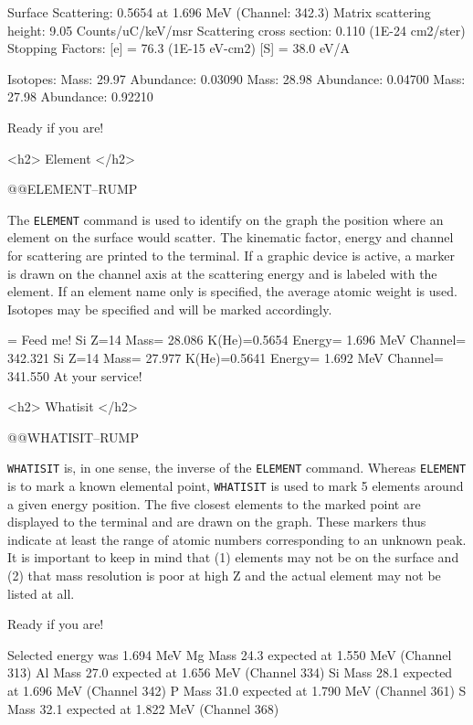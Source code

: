 {{{{{ Surface Scattering:         0.5654 at  1.696 MeV (Channel: 342.3)
 Matrix scattering height:     9.05 Counts/uC/keV/msr
 Scattering cross section:     0.110 (1E-24 cm2/ster)
 Stopping Factors:  [e] =  76.3 (1E-15 eV-cm2)   [S] =  38.0 eV/A

Isotopes:  Mass:  29.97  Abundance: 0.03090
           Mass:  28.98  Abundance: 0.04700
           Mass:  27.98  Abundance: 0.92210

Ready if you are! 
\endscreen

<h2> Element </h2>


@@{ELEMENT--RUMP}

The {\tt ELEMENT} command is used to identify on the graph the position where
an element on the surface would scatter.  The kinematic factor, energy and
channel for scattering are printed to the terminal.  If a graphic device is
active, a marker is drawn on the channel axis at the scattering energy and is
labeled with the element.  If an element name only is specified, the average
atomic weight is used.  Isotopes may be specified and will be marked
accordingly.

\medskip \screenwidth=\hsize \beginscreen
Feed me! 
 Si  Z=14  Mass= 28.086  K(He)=0.5654  Energy= 1.696 MeV  Channel= 342.321
 Si  Z=14  Mass= 27.977  K(He)=0.5641  Energy= 1.692 MeV  Channel= 341.550
At your service! 
\endscreen

<h2> Whatisit </h2>


@@{WHATISIT--RUMP}

{\tt WHATISIT} is, in one sense, the inverse of the {\tt ELEMENT} command.
Whereas {\tt ELEMENT} is to mark a known elemental point, {\tt WHATISIT} is
used to mark 5 elements around a given energy position.  The five closest
elements to the marked point are displayed to the terminal and are drawn on
the graph.  These markers thus indicate at least the range of atomic numbers
corresponding to an unknown peak.  It is important to keep in mind that (1)
elements may not be on the surface and (2) that mass resolution is poor at
high Z and the actual element may not be listed at all.

\medskip\beginscreen
Ready if you are! 

 Selected energy was  1.694 MeV
 Mg Mass  24.3   expected at  1.550 MeV (Channel  313)
 Al Mass  27.0   expected at  1.656 MeV (Channel  334)
 Si Mass  28.1   expected at  1.696 MeV (Channel  342)
 P  Mass  31.0   expected at  1.790 MeV (Channel  361)
 S  Mass  32.1   expected at  1.822 MeV (Channel  368)

}}}}}
